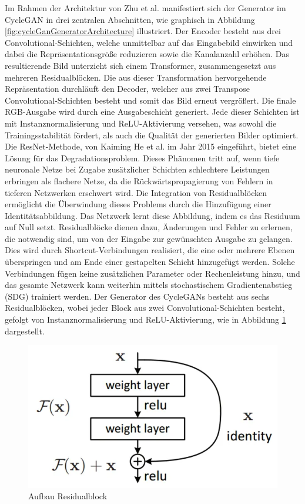 Im Rahmen der Architektur von Zhu et al. manifestiert sich der Generator im CycleGAN in drei zentralen Abschnitten, wie graphisch in Abbildung \ref{fig:cycleGanGeneratorArchitecture} illustriert. Der Encoder besteht aus drei Convolutional-Schichten, welche unmittelbar auf das Eingabebild einwirken und dabei die Repräsentationsgröße reduzieren sowie die Kanalanzahl erhöhen. Das resultierende Bild unterzieht sich einem Transformer, zusammengesetzt aus mehreren Residualblöcken. Die aus dieser Transformation hervorgehende Repräsentation durchläuft den Decoder, welcher aus zwei Transpose Convolutional-Schichten besteht und somit das Bild erneut vergrößert. Die finale RGB-Ausgabe wird durch eine Ausgabeschicht generiert. Jede dieser Schichten ist mit Instanznormalisierung und ReLU-Aktivierung versehen, was sowohl die Trainingsstabilität fördert, als auch die Qualität der generierten Bilder optimiert\cite{Ulyanov.2016, 10.5555/3104322.3104425}. 
\\
\newline
Die ResNet-Methode, von Kaiming He et al. im Jahr 2015 eingeführt, bietet eine Lösung für das Degradationsproblem. Dieses Phänomen tritt auf, wenn tiefe neuronale Netze bei Zugabe zusätzlicher Schichten schlechtere Leistungen erbringen als flachere Netze, da die Rückwärtspropagierung von Fehlern in tieferen Netzwerken erschwert wird. Die Integration von Residualblöcken ermöglicht die Überwindung dieses Problems durch die Hinzufügung einer Identitätsabbildung. Das Netzwerk lernt diese Abbildung, indem es das Residuum auf Null setzt. Residualblöcke dienen dazu, Änderungen und Fehler zu erlernen, die notwendig sind, um von der Eingabe zur gewünschten Ausgabe zu gelangen. Dies wird durch Shortcut-Verbindungen realisiert, die eine oder mehrere Ebenen überspringen und am Ende einer gestapelten Schicht hinzugefügt werden. Solche Verbindungen fügen keine zusätzlichen Parameter oder Rechenleistung hinzu, und das gesamte Netzwerk kann weiterhin mittels stochastischem Gradientenabstieg (SDG) trainiert werden\cite{He.2015}.
Der Generator des CycleGANs besteht aus sechs Residualblöcken, wobei jeder Block aus zwei Convolutional-Schichten besteht, gefolgt von Instanznormalisierung und ReLU-Aktivierung, wie in Abbildung \ref{fig:residualBlock} dargestellt.

\begin{figure}[ht]
	\centering
	\includegraphics[width=0.5\linewidth]{./images/residualBlock.png}
	\caption{Aufbau Residualblock}
	\label{fig:residualBlock}
\end{figure}

